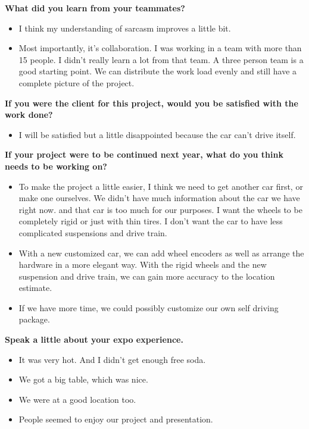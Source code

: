\documentclass[compsoc,draftclsnofoot,onecolumn,10pt]{IEEEtran}
\begin{document}
\textbf{What did you learn from your teammates?}
\begin{itemize}
  \item I think my understanding of sarcasm improves a little bit.
  \item Most importantly, it's collaboration. I was working in a team with more
  than 15 people. I didn't really learn a lot from that team. A three person team
  is a good starting point. We can distribute the work load evenly and still have
  a complete picture of the project.
\end{itemize}

\textbf{If you were the client for this project, would you be satisfied with the work done?}
\begin{itemize}
  \item I will be satisfied but a little disappointed because the car can't drive itself.
\end{itemize}

\textbf{If your project were to be continued next year, what do you think needs to be working on?}
\begin{itemize}
  \item To make the project a little easier, I think we need to get another car first,
  or make one ourselves. We didn't have much information about the car we have right
  now. and that car is too much for our purposes. I want the wheels to be completely
  rigid or just with thin tires. I don't want the car to have less complicated
  suspensions and drive train.
  \item With a new customized car, we can add wheel encoders as well as arrange the
  hardware in a more elegant way. With the rigid wheels and the new suspension and
  drive train, we can gain more accuracy to the location estimate.
  \item If we have more time, we could possibly customize our own self driving package.
\end{itemize}

\textbf{Speak a little about your expo experience.}
\begin{itemize}
  \item It was very hot. And I didn't get enough free soda.
  \item We got a big table, which was nice.
  \item We were at a good location too.
  \item People seemed to enjoy our project and presentation.
\end{itemize}
\end{document}
